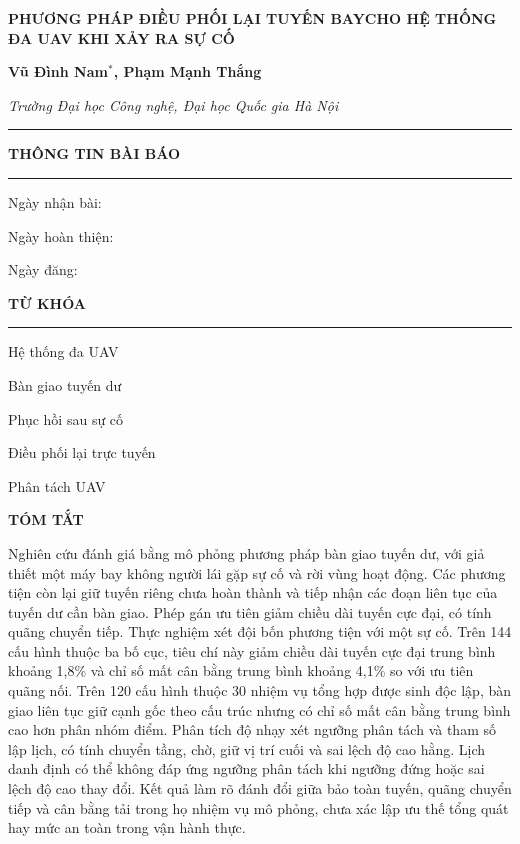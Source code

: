 \documentclass[11pt,a4paper]{article}
\newif\ifanonymous
\newcommand{\tnuinfoheading}[1]{%
  {\centering\fontsize{10}{11.5}\selectfont\bfseries #1\par}%
  \vspace{3pt}\hrule\vspace{4pt}}
\begin{document}
\vspace{10pt}
\begingroup\setlength{\parindent}{0pt}\raggedright
{\fontsize{12}{14}\selectfont\bfseries\MakeUppercase{Phương pháp điều phối lại tuyến bay\newline cho hệ thống đa UAV khi xảy ra sự cố}\par}
\ifanonymous\else
\vspace{4pt}
{\fontsize{10}{11.5}\selectfont\bfseries Vũ Đình Nam$^{*}$, Phạm Mạnh Thắng\par}
{\fontsize{9}{10.5}\selectfont\itshape Trường Đại học Công nghệ, Đại học Quốc gia Hà Nội\par}
\fi
\endgroup
\vspace{6pt}\hrule\vspace{4pt}

\noindent
\begin{minipage}[t]{0.30\textwidth}
\raggedright\fontsize{10}{11.5}\selectfont
\tnuinfoheading{THÔNG TIN BÀI BÁO}
{\raggedleft\fontsize{9}{10.5}\selectfont
Ngày nhận bài:\par\vspace{6pt}
Ngày hoàn thiện:\par\vspace{6pt}
Ngày đăng:\par}
\vspace{8pt}
\tnuinfoheading{TỪ KHÓA}
Hệ thống đa UAV\par
Bàn giao tuyến dư\par
Phục hồi sau sự cố\par
Điều phối lại trực tuyến\par
Phân tách UAV
\end{minipage}\hfill
\begin{minipage}[t]{0.67\textwidth}
\fontsize{10}{11.5}\selectfont
\textbf{TÓM TẮT}\par\vspace{4pt}
Nghiên cứu đánh giá bằng mô phỏng phương pháp bàn giao tuyến dư, với giả thiết một máy bay không người lái gặp sự cố và rời vùng hoạt động. Các phương tiện còn lại giữ tuyến riêng chưa hoàn thành và tiếp nhận các đoạn liên tục của tuyến dư cần bàn giao. Phép gán ưu tiên giảm chiều dài tuyến cực đại, có tính quãng chuyển tiếp. Thực nghiệm xét đội bốn phương tiện với một sự cố. Trên 144 cấu hình thuộc ba bố cục, tiêu chí này giảm chiều dài tuyến cực đại trung bình khoảng 1,8\% và chỉ số mất cân bằng trung bình khoảng 4,1\% so với ưu tiên quãng nối. Trên 120 cấu hình thuộc 30 nhiệm vụ tổng hợp được sinh độc lập, bàn giao liên tục giữ cạnh gốc theo cấu trúc nhưng có chỉ số mất cân bằng trung bình cao hơn phân nhóm điểm. Phân tích độ nhạy xét ngưỡng phân tách và tham số lập lịch, có tính chuyển tầng, chờ, giữ vị trí cuối và sai lệch độ cao hằng. Lịch danh định có thể không đáp ứng ngưỡng phân tách khi ngưỡng đứng hoặc sai lệch độ cao thay đổi. Kết quả làm rõ đánh đổi giữa bảo toàn tuyến, quãng chuyển tiếp và cân bằng tải trong họ nhiệm vụ mô phỏng, chưa xác lập ưu thế tổng quát hay mức an toàn trong vận hành thực.
\end{minipage}
\end{document}
